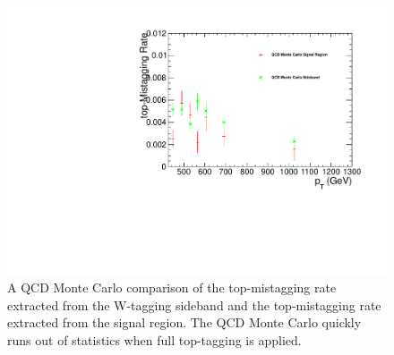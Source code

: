 \begin{figure}[htcb]
\centering
\includegraphics[width=1.0\textwidth]{AN-14-049/figs/qcdtrcomp.pdf}
\caption{ 
A QCD Monte Carlo comparison of the top-mistagging rate extracted from the W-tagging sideband and the top-mistagging rate extracted from the signal region.  The QCD Monte Carlo quickly runs out of statistics when 
full top-tagging is applied.}
\label{figs:bsqcdtr}
\end{figure} 



